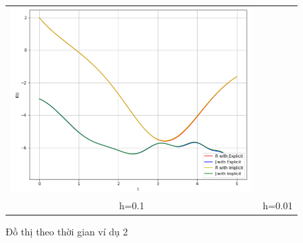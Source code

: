 \documentclass[a4paper]{article}
\begin{document}
\begin{enumerate}
\begin{enumerate}
\begin{figure}[htp]
\begin{tabular}{cc}
        \includegraphics[scale = .58]{Images/Bt4/vd2/h=0.01.png} \\
        h=0.1 & h=0.01
    \end{tabular}
    \caption{Đồ thị theo thời gian ví dụ 2}
\end{figure}


\end{enumerate}
\end{enumerate}
\end{document}
